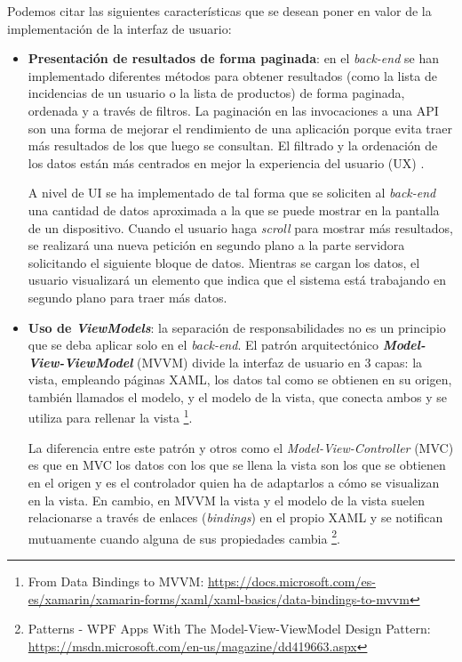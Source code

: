 \documentclass[11pt,spanish,listoffigures]{tfgetsinf}
\begin{document}
Podemos citar las siguientes características que se desean poner en valor de la implementación de la interfaz de usuario:

\begin{itemize}

\item \textbf{Presentación de resultados de forma paginada}: en el \textit{back-end} se han implementado diferentes métodos para obtener resultados (como la lista de incidencias de un usuario o la lista de productos) de forma paginada, ordenada y a través de filtros. La paginación en las invocaciones a una API son una forma de mejorar el rendimiento de una aplicación porque evita traer más resultados de los que luego se consultan. El filtrado y la ordenación de los datos están más centrados en mejor la experiencia del usuario (UX) \cite{Gilling2018}.

A nivel de UI se ha implementado de tal forma que se soliciten al \textit{back-end} una cantidad de datos aproximada a la que se puede mostrar en la pantalla de un dispositivo. Cuando el usuario haga \textit{scroll} para mostrar más resultados, se realizará una nueva petición en segundo plano a la parte servidora solicitando el siguiente bloque de datos. Mientras se cargan los datos, el usuario visualizará un elemento que indica que el sistema está trabajando en segundo plano para traer más datos.


\item \textbf{Uso de \textit{ViewModels}}: la separación de responsabilidades no es un principio que se deba aplicar solo en el \textit{back-end}. El patrón arquitectónico \textbf{\textit{Model-View-ViewModel}} (MVVM) divide la interfaz de usuario en 3 capas: la vista, empleando páginas XAML, los datos tal como se obtienen en su origen, también llamados el modelo, y el modelo de la vista, que conecta ambos y se utiliza para rellenar la vista \footnote{From Data Bindings to MVVM: \url{https://docs.microsoft.com/es-es/xamarin/xamarin-forms/xaml/xaml-basics/data-bindings-to-mvvm}}.

La diferencia entre este patrón y otros como el \textit{Model-View-Controller} (MVC) es que en MVC los datos con los que se llena la vista son los que se obtienen en el origen y es el controlador quien ha de adaptarlos a cómo se visualizan en la vista. En cambio, en MVVM la vista y el modelo de la vista suelen relacionarse a través de enlaces (\textit{bindings}) en el propio XAML y se notifican mutuamente cuando alguna de sus propiedades cambia \footnote{ Patterns - WPF Apps With The Model-View-ViewModel Design Pattern: \url{https://msdn.microsoft.com/en-us/magazine/dd419663.aspx}}.


\end{itemize}
\end{document}
